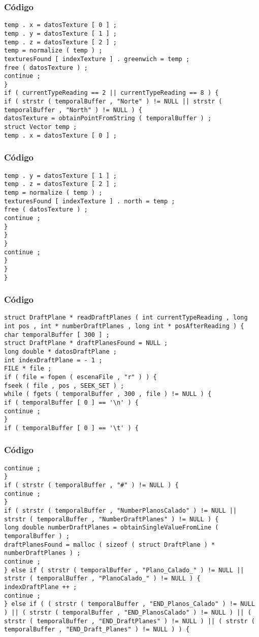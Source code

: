 \documentclass{beamer}
\begin{document}
\begin{frame}[fragile]
\frametitle{C\'odigo}
\begin{verbatim}
temp . x = datosTexture [ 0 ] ; 
temp . y = datosTexture [ 1 ] ; 
temp . z = datosTexture [ 2 ] ; 
temp = normalize ( temp ) ; 
texturesFound [ indexTexture ] . greenwich = temp ; 
free ( datosTexture ) ; 
continue ; 
} 
if ( currentTypeReading == 2 || currentTypeReading == 8 ) { 
if ( strstr ( temporalBuffer , "Norte" ) != NULL || strstr ( temporalBuffer , "North" ) != NULL ) { 
datosTexture = obtainPointFromString ( temporalBuffer ) ; 
struct Vector temp ; 
temp . x = datosTexture [ 0 ] ; 
\end{verbatim}
\end{frame}
\begin{frame}[fragile]
\frametitle{C\'odigo}
\begin{verbatim}
temp . y = datosTexture [ 1 ] ; 
temp . z = datosTexture [ 2 ] ; 
temp = normalize ( temp ) ; 
texturesFound [ indexTexture ] . north = temp ; 
free ( datosTexture ) ; 
continue ; 
} 
} 
} 
continue ; 
} 
} 
} 
\end{verbatim}
\end{frame}
\begin{frame}[fragile]
\frametitle{C\'odigo}
\begin{verbatim}
struct DraftPlane * readDraftPlanes ( int currentTypeReading , long int pos , int * numberDraftPlanes , long int * posAfterReading ) { 
char temporalBuffer [ 300 ] ; 
struct DraftPlane * draftPlanesFound = NULL ; 
long double * datosDraftPlane ; 
int indexDraftPlane = - 1 ; 
FILE * file ; 
if ( file = fopen ( escenaFile , "r" ) ) { 
fseek ( file , pos , SEEK_SET ) ; 
while ( fgets ( temporalBuffer , 300 , file ) != NULL ) { 
if ( temporalBuffer [ 0 ] == '\n' ) { 
continue ; 
} 
if ( temporalBuffer [ 0 ] == '\t' ) { 
\end{verbatim}
\end{frame}
\begin{frame}[fragile]
\frametitle{C\'odigo}
\begin{verbatim}
continue ; 
} 
if ( strstr ( temporalBuffer , "#" ) != NULL ) { 
continue ; 
} 
if ( strstr ( temporalBuffer , "NumberPlanosCalado" ) != NULL || strstr ( temporalBuffer , "NumberDraftPlanes" ) != NULL ) { 
long double numberDraftPlanes = obtainSingleValueFromLine ( temporalBuffer ) ; 
draftPlanesFound = malloc ( sizeof ( struct DraftPlane ) * numberDraftPlanes ) ; 
continue ; 
} else if ( strstr ( temporalBuffer , "Plano_Calado_" ) != NULL || strstr ( temporalBuffer , "PlanoCalado_" ) != NULL ) { 
indexDraftPlane ++ ; 
continue ; 
} else if ( ( strstr ( temporalBuffer , "END_Planos_Calado" ) != NULL ) || ( strstr ( temporalBuffer , "END_PlanosCalado" ) != NULL ) || ( strstr ( temporalBuffer , "END_DraftPlanes" ) != NULL ) || ( strstr ( temporalBuffer , "END_Draft_Planes" ) != NULL ) ) { 
\end{verbatim}
\end{frame}
\end{document}

